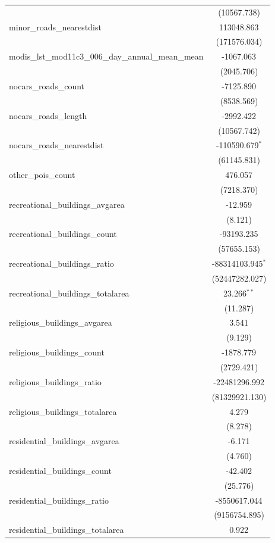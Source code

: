 \begin{table}[!htbp]
\begin{tabular}{@{\extracolsep{5pt}}lc}
  & (10567.738) \\
 minor_roads_nearestdist & 113048.863$^{}$ \\
  & (171576.034) \\
 modis_lst_mod11c3_006_day_annual_mean_mean & -1067.063$^{}$ \\
  & (2045.706) \\
 nocars_roads_count & -7125.890$^{}$ \\
  & (8538.569) \\
 nocars_roads_length & -2992.422$^{}$ \\
  & (10567.742) \\
 nocars_roads_nearestdist & -110590.679$^{*}$ \\
  & (61145.831) \\
 other_pois_count & 476.057$^{}$ \\
  & (7218.370) \\
 recreational_buildings_avgarea & -12.959$^{}$ \\
  & (8.121) \\
 recreational_buildings_count & -93193.235$^{}$ \\
  & (57655.153) \\
 recreational_buildings_ratio & -88314103.945$^{*}$ \\
  & (52447282.027) \\
 recreational_buildings_totalarea & 23.266$^{**}$ \\
  & (11.287) \\
 religious_buildings_avgarea & 3.541$^{}$ \\
  & (9.129) \\
 religious_buildings_count & -1878.779$^{}$ \\
  & (2729.421) \\
 religious_buildings_ratio & -22481296.992$^{}$ \\
  & (81329921.130) \\
 religious_buildings_totalarea & 4.279$^{}$ \\
  & (8.278) \\
 residential_buildings_avgarea & -6.171$^{}$ \\
  & (4.760) \\
 residential_buildings_count & -42.402$^{}$ \\
  & (25.776) \\
 residential_buildings_ratio & -8550617.044$^{}$ \\
  & (9156754.895) \\
 residential_buildings_totalarea & 0.922$^{}$ \\

\end{tabular}
\end{table}
